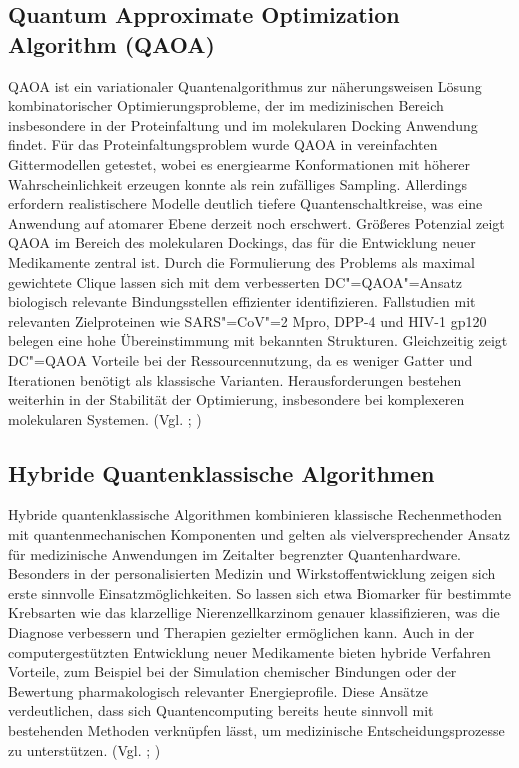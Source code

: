 \subsection{Quantum Approximate Optimization Algorithm (QAOA)}
QAOA ist ein variationaler Quantenalgorithmus zur näherungsweisen Lösung kombinatorischer Optimierungsprobleme, der im medizinischen Bereich insbesondere in der Proteinfaltung und im molekularen Docking Anwendung findet. Für das Proteinfaltungsproblem wurde QAOA in vereinfachten Gittermodellen getestet, wobei es energiearme Konformationen mit höherer Wahrscheinlichkeit erzeugen konnte als rein zufälliges Sampling. Allerdings erfordern realistischere Modelle deutlich tiefere Quantenschaltkreise, was eine Anwendung auf atomarer Ebene derzeit noch erschwert. Größeres Potenzial zeigt QAOA im Bereich des molekularen Dockings, das für die Entwicklung neuer Medikamente zentral ist. Durch die Formulierung des Problems als maximal gewichtete Clique lassen sich mit dem verbesserten DC"=QAOA"=Ansatz biologisch relevante Bindungsstellen effizienter identifizieren. Fallstudien mit relevanten Zielproteinen wie SARS"=CoV"=2 Mpro, DPP-4 und HIV-1 gp120 belegen eine hohe Übereinstimmung mit bekannten Strukturen. Gleichzeitig zeigt DC"=QAOA Vorteile bei der Ressourcennutzung, da es weniger Gatter und Iterationen benötigt als klassische Varianten. Herausforderungen bestehen weiterhin in der Stabilität der Optimierung, insbesondere bei komplexeren molekularen Systemen. (Vgl. \cite{ding_molecular_2024}; \cite{boulebnane_peptide_2023})

\subsection{Hybride Quantenklassische Algorithmen}
Hybride quantenklassische Algorithmen kombinieren klassische Rechenmethoden mit quantenmechanischen Komponenten und gelten als vielversprechender Ansatz für medizinische Anwendungen im Zeitalter begrenzter Quantenhardware. Besonders in der personalisierten Medizin und Wirkstoffentwicklung zeigen sich erste sinnvolle Einsatzmöglichkeiten. So lassen sich etwa Biomarker für bestimmte Krebsarten wie das klarzellige Nierenzellkarzinom genauer klassifizieren, was die Diagnose verbessern und Therapien gezielter ermöglichen kann. Auch in der computergestützten Entwicklung neuer Medikamente bieten hybride Verfahren Vorteile, zum Beispiel bei der Simulation chemischer Bindungen oder der Bewertung pharmakologisch relevanter Energieprofile. Diese Ansätze verdeutlichen, dass sich Quantencomputing bereits heute sinnvoll mit bestehenden Methoden verknüpfen lässt, um medizinische Entscheidungsprozesse zu unterstützen. (Vgl. \cite{li_hybrid_2024}; \cite{astuti_use_2025})

